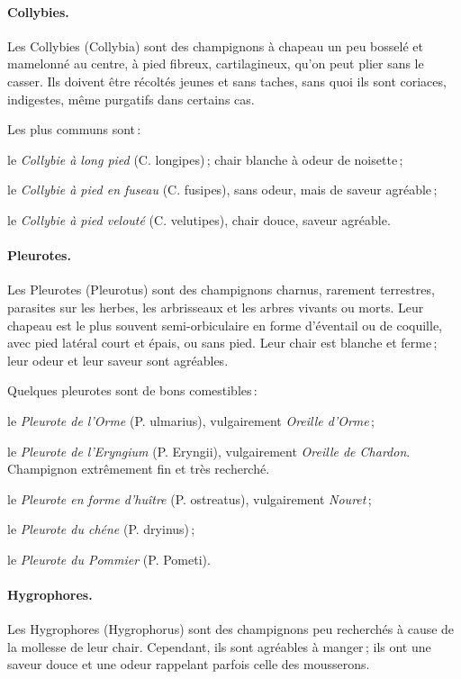 \paragraph{Collybies.}

Les Collybies (Collybia) sont des champignons à chapeau un peu bosselé et
mamelonné au centre, à pied fibreux, cartilagineux, qu'on peut plier sans le
casser. Ils doivent être récoltés jeunes et sans taches, sans quoi ils sont
coriaces, indigestes, même purgatifs dans certains cas.

Les plus communs sont :

le \textit{Collybie à long pied} (C. longipes) ; chair blanche à odeur de noisette ;

le \textit{Collybie à pied en fuseau} (C. fusipes), sans odeur, mais de saveur agréable ;

le \textit{Collybie à pied velouté} (C. velutipes), chair douce, saveur agréable.

\paragraph{Pleurotes.}

Les Pleurotes (Pleurotus) sont des champignons charnus, rarement terrestres,
parasites sur les herbes, les arbrisseaux et les arbres vivants ou morts. Leur
chapeau est le plus souvent semi-orbiculaire en forme d'éventail ou de
coquille, avec pied latéral court et épais, ou sans pied. Leur chair est
blanche et ferme ; leur odeur et leur saveur sont agréables.

Quelques pleurotes sont de bons comestibles :

le \textit{Pleurote de l'Orme} (P. ulmarius), vulgairement \textit{Oreille d'Orme} ;

le \textit{Pleurote de l'Eryngium} (P. Eryngii), vulgairement \textit{Oreille de
Chardon}. Champignon extrêmement fin et très recherché.

le \textit{Pleurote en forme d'huître} (P. ostreatus), vulgairement \textit{Nouret} ;

le \textit{Pleurote du chéne} (P. dryinus) ;

le \textit{Pleurote du Pommier} (P. Pometi).

\paragraph{Hygrophores.}

Les Hygrophores (Hygrophorus) sont des champignons peu recherchés à cause de la
mollesse de leur chair. Cependant, ils sont agréables à manger ; ils ont une
saveur douce et une odeur rappelant parfois celle des mousserons.

